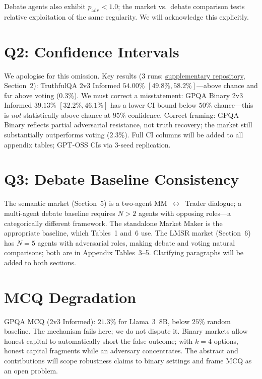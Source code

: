 \documentclass[10pt]{article}
\newcommand{\supp}{\href{[ANONYMISED\_REPO\_URL]}{supplementary repository}}
\begin{document}
Debate agents also exhibit $p_\text{adv} < 1.0$; the market vs.\ debate
comparison tests relative exploitation of the same regularity. We will
acknowledge this explicitly.

\section*{Q2: Confidence Intervals}

We apologise for this omission. Key results (3 runs; \supp, Section~2):
TruthfulQA 2v3 Informed $54.00\%$ $[49.8\%, 58.2\%]$---above chance and far
above voting ($0.3\%$). We must correct a misstatement: GPQA Binary 2v3
Informed $39.13\%$ $[32.2\%, 46.1\%]$ has a lower CI bound below $50\%$
chance---this is \emph{not} statistically above chance at $95\%$ confidence.
Correct framing: GPQA Binary reflects partial adversarial resistance, not truth
recovery; the market still substantially outperforms voting ($2.3\%$). Full CI
columns will be added to all appendix tables; GPT-OSS CIs via 3-seed replication.

\section*{Q3: Debate Baseline Consistency}

The semantic market (Section~5) is a two-agent MM~$\leftrightarrow$~Trader
dialogue; a multi-agent debate baseline requires $N{>}2$ agents with opposing
roles---a categorically different framework. The standalone Market Maker is the
appropriate baseline, which Tables~1 and~6 use. The LMSR market (Section~6) has
$N{=}5$ agents with adversarial roles, making debate and voting natural
comparisons; both are in Appendix Tables~3--5. Clarifying paragraphs will be
added to both sections.

\section*{MCQ Degradation}

GPQA MCQ (2v3 Informed): $21.3\%$ for Llama~3~8B, below $25\%$ random
baseline. The mechanism fails here; we do not dispute it. Binary markets allow
honest capital to automatically short the false outcome; with $k{=}4$ options,
honest capital fragments while an adversary concentrates. The abstract and
contributions will scope robustness claims to binary settings and frame MCQ as
an open problem.
\end{document}
